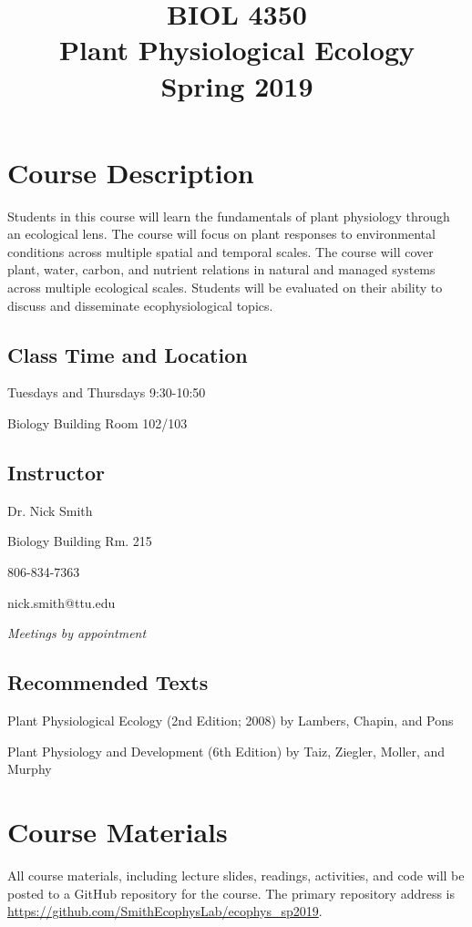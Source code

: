 \documentclass[12pt, notitlepage]{article}   	%
\title{
	\textbf{
		BIOL 4350
	} \\
	\large Plant Physiological Ecology \\
	\large Spring 2019
}
\date{\vspace{-5ex}}
\begin{document}
\maketitle

\section{Course Description}
Students in this course will learn the fundamentals of plant physiology through 
an ecological lens. The course will focus on plant responses to environmental conditions 
across multiple spatial and temporal scales. The course will cover plant, water, carbon, 
and nutrient relations in natural and managed systems across multiple ecological scales. 
Students will be evaluated on their 
ability to discuss and disseminate ecophysiological topics.

\subsection{Class Time and Location}
Tuesdays and Thursdays 9:30-10:50

Biology Building Room 102/103

\subsection{Instructor}
Dr. Nick Smith \par
Biology Building Rm. 215 \par
806-834-7363 \par
nick.smith@ttu.edu \par
\textit{Meetings by appointment}

\subsection{Recommended Texts}
Plant Physiological Ecology (2nd Edition; 2008) by Lambers, Chapin, and Pons \par
Plant Physiology and Development (6th Edition) by Taiz, Ziegler, Moller, and Murphy

\section{Course Materials}
All course materials, including lecture slides, readings, activities, and code 
will be posted to a GitHub repository for the course.
The primary repository address is
\url{https://github.com/SmithEcophysLab/ecophys_sp2019}.
\end{document}
